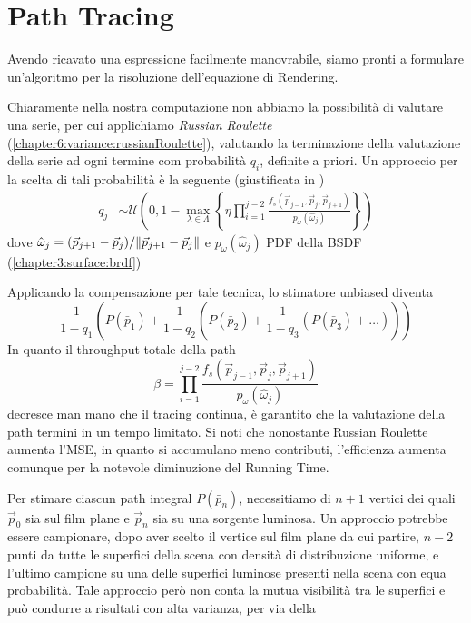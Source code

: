 \section{Path Tracing}
Avendo ricavato una espressione facilmente manovrabile, siamo pronti a formulare un'algoritmo per la risoluzione dell'equazione di Rendering.\par
Chiaramente nella nostra computazione non abbiamo la possibilit\`a di valutare una serie, per cui applichiamo \textit{Russian Roulette} 
(\ref{chapter6:variance:russianRoulette}), valutando la terminazione della valutazione della serie ad ogni termine com probabilit\`a $q_i$, definite 
a priori. Un approccio per la scelta di tali probabilit\`a \`e la seguente (giustificata in \cite{pharr})
\begin{align}
	q_j&\sim\mathcal{U}\left(0,1-\max_{\lambda\in\Lambda}\left\{
		\eta\prod_{i=1}^{j-2}\frac{f_s(\vec{p}_{j-1},\vec{p}_j,\vec{p}_{j+1})}{p_\omega(\hat{\omega}_j)}\right\}\right)
\end{align}
dove $\hat{\omega}_j=(\vec{p}_{j+1}-\vec{p}_j)/\norm{\vec{p}_{j+1}-\vec{p}_j}$ e $p_\omega(\hat{\omega}_j)$ PDF della BSDF 
(\ref{chapter3:surface:brdf})\par
Applicando la compensazione per tale tecnica, lo stimatore unbiased diventa
\begin{equation}
	\frac{1}{1-q_1}\left(P(\bar{p}_1)+\frac{1}{1-q_2}\left(P(\bar{p}_2)+\frac{1}{1-q_3}\left(P(\bar{p}_3)+\ldots\right)\right)\right)
\end{equation}
In quanto il throughput totale della path
\begin{equation*}
	\beta=\prod_{i=1}^{j-2}\frac{f_s(\vec{p}_{j-1},\vec{p}_j,\vec{p}_{j+1})}{p_\omega(\hat{\omega}_j)}
\end{equation*}
decresce man mano che il tracing continua, \`e garantito che la valutazione della path termini in un tempo limitato. Si noti che nonostante Russian
Roulette aumenta l'MSE, in quanto si accumulano meno contributi, l'efficienza aumenta comunque per la notevole diminuzione del Running Time.\par
Per stimare ciascun path integral $P(\bar{p}_n)$, necessitiamo di $n+1$ vertici dei quali $\vec{p}_0$ sia sul film plane e $\vec{p}_n$ sia su una 
sorgente luminosa. Un approccio potrebbe essere campionare, dopo aver scelto il vertice sul film plane da cui partire, $n-2$ punti da tutte le 
superfici della scena con densit\`a di distribuzione uniforme, e l'ultimo campione su una delle superfici luminose presenti nella scena con equa
probabilit\`a. Tale approccio per\`o non conta la mutua visibilit\`a tra le superfici e pu\`o condurre a risultati con alta varianza, per via della 

